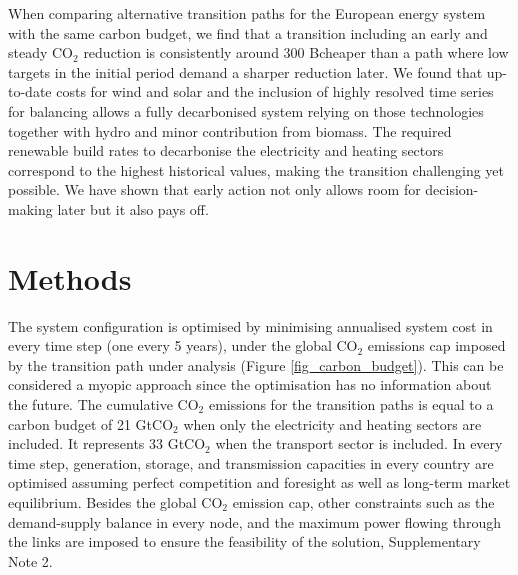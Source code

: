 \documentclass[5p]{elsarticle} %
\begin{document}
When comparing alternative transition paths for the European energy system with the same carbon budget, we find that a transition including an early and steady CO$_2$ reduction is consistently around 300 B\EUR cheaper than a path where low targets in the initial period demand a sharper reduction later.  We found that up-to-date costs for wind and solar and the inclusion of highly resolved time series for balancing allows a fully decarbonised system relying on those technologies together with hydro and minor contribution from biomass. The required renewable build rates to decarbonise the electricity and heating sectors correspond to the highest historical values, making the transition challenging yet possible. We have shown that early action not only allows room for decision-making later but it also pays off. 



\FloatBarrier
\section{Methods}

The system configuration is optimised by minimising annualised system cost in every time step (one every 5 years), under the global CO$_2$ emissions cap imposed by the transition path under analysis (Figure \ref{fig_carbon_budget}). This can be considered a myopic approach since the optimisation has no information about the future. The cumulative CO$_2$ emissions for the transition paths is equal to a carbon budget of 21 GtCO$_2$ when only the electricity and heating sectors are included. It represents 33 GtCO$_2$ when the transport sector is included. In every time step, generation, storage, and transmission capacities in every country are optimised assuming perfect competition and foresight as well as long-term market equilibrium. Besides the global CO$_2$ emission cap, other constraints such as the demand-supply balance in every node, and the maximum power flowing through the links are imposed to ensure the feasibility of the solution, Supplementary Note 2. \
\end{document}
